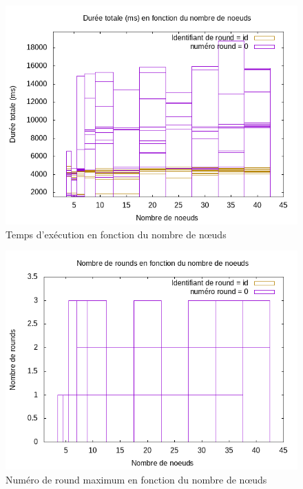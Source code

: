 \documentclass[french]{article}
\begin{document}
\begin{figure}[ht]
    \centering
    \includegraphics[width=1\textwidth]{NoeudDuree.png} %
    \caption{Temps d'exécution en fonction du nombre de nœuds}
    \label{fig:time-node}
\end{figure}

\begin{figure}[ht]
    \centering
    \includegraphics[width=1\textwidth]{NoeudsRounds.png} %
    \caption{Numéro de round maximum en fonction du nombre de nœuds}
    \label{fig:round-node}
\end{figure}
\end{document}
